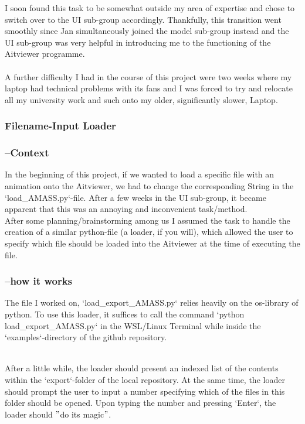 \documentclass[a4paper]{scrartcl}
\begin{document}
I soon found this task to be somewhat outside my area of expertise and chose to switch over to the UI sub-group accordingly. Thankfully, this transition went smoothly since Jan simultaneously joined the model sub-group instead and the UI sub-group was very helpful in introducing me to the functioning of the Aitviewer programme.\\
\\
A further difficulty I had in the course of this project were two weeks where my laptop had technical problems with its fans and I was forced to try and relocate all my university work and such onto my older, significantly slower, Laptop.

\subsubsection*{Filename-Input Loader}
\subsubsection*{--Context}
In the beginning of this project, if we wanted to load a specific file with an animation onto the Aitviewer, we had to change the corresponding String in the `load\_AMASS.py`-file. After a few weeks in the UI sub-group, it became apparent that this was an annoying and inconvenient task/method.
\\
After some planning/brainstorming among us I assumed the task to handle the creation of a similar python-file (a loader, if you will), which allowed the user to specify which file should be loaded into the Aitviewer at the time of executing the file.

\subsubsection*{--how it works}
The file I worked on, `load\_export\_AMASS.py` relies heavily on the os-library of python.
To use this loader, it suffices to call the command `python load\_export\_AMASS.py` in the WSL/Linux Terminal while inside the `examples`-directory of the github repository.

\\
After a little while, the loader should present an indexed list of the contents within the `export`-folder of the local repository. At the same time, the loader should prompt the user to input a number specifying which of the files in this folder should be opened. Upon typing the number and pressing `Enter`, the loader should $"$do its magic$"$.
\end{document}
